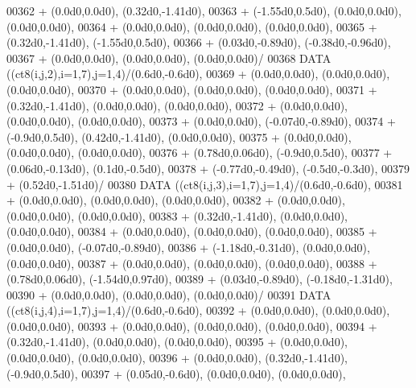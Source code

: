 \begin{DoxyCode}
00362      +                  (0.0d0,0.0d0), (0.32d0,-1.41d0),
00363      +                  (-1.55d0,0.5d0), (0.0d0,0.0d0), (0.0d0,0.0d0),
00364      +                  (0.0d0,0.0d0), (0.0d0,0.0d0), (0.0d0,0.0d0),
00365      +                  (0.32d0,-1.41d0), (-1.55d0,0.5d0),
00366      +                  (0.03d0,-0.89d0), (-0.38d0,-0.96d0),
00367      +                  (0.0d0,0.0d0), (0.0d0,0.0d0), (0.0d0,0.0d0)/
00368       \textcolor{keyword}{DATA}              ((ct8(i,j,2),i=1,7),j=1,4)/(0.6d0,-0.6d0),
00369      +                  (0.0d0,0.0d0), (0.0d0,0.0d0), (0.0d0,0.0d0),
00370      +                  (0.0d0,0.0d0), (0.0d0,0.0d0), (0.0d0,0.0d0),
00371      +                  (0.32d0,-1.41d0), (0.0d0,0.0d0), (0.0d0,0.0d0),
00372      +                  (0.0d0,0.0d0), (0.0d0,0.0d0), (0.0d0,0.0d0),
00373      +                  (0.0d0,0.0d0), (-0.07d0,-0.89d0),
00374      +                  (-0.9d0,0.5d0), (0.42d0,-1.41d0), (0.0d0,0.0d0),
00375      +                  (0.0d0,0.0d0), (0.0d0,0.0d0), (0.0d0,0.0d0),
00376      +                  (0.78d0,0.06d0), (-0.9d0,0.5d0),
00377      +                  (0.06d0,-0.13d0), (0.1d0,-0.5d0),
00378      +                  (-0.77d0,-0.49d0), (-0.5d0,-0.3d0),
00379      +                  (0.52d0,-1.51d0)/
00380       \textcolor{keyword}{DATA}              ((ct8(i,j,3),i=1,7),j=1,4)/(0.6d0,-0.6d0),
00381      +                  (0.0d0,0.0d0), (0.0d0,0.0d0), (0.0d0,0.0d0),
00382      +                  (0.0d0,0.0d0), (0.0d0,0.0d0), (0.0d0,0.0d0),
00383      +                  (0.32d0,-1.41d0), (0.0d0,0.0d0), (0.0d0,0.0d0),
00384      +                  (0.0d0,0.0d0), (0.0d0,0.0d0), (0.0d0,0.0d0),
00385      +                  (0.0d0,0.0d0), (-0.07d0,-0.89d0),
00386      +                  (-1.18d0,-0.31d0), (0.0d0,0.0d0), (0.0d0,0.0d0),
00387      +                  (0.0d0,0.0d0), (0.0d0,0.0d0), (0.0d0,0.0d0),
00388      +                  (0.78d0,0.06d0), (-1.54d0,0.97d0),
00389      +                  (0.03d0,-0.89d0), (-0.18d0,-1.31d0),
00390      +                  (0.0d0,0.0d0), (0.0d0,0.0d0), (0.0d0,0.0d0)/
00391       \textcolor{keyword}{DATA}              ((ct8(i,j,4),i=1,7),j=1,4)/(0.6d0,-0.6d0),
00392      +                  (0.0d0,0.0d0), (0.0d0,0.0d0), (0.0d0,0.0d0),
00393      +                  (0.0d0,0.0d0), (0.0d0,0.0d0), (0.0d0,0.0d0),
00394      +                  (0.32d0,-1.41d0), (0.0d0,0.0d0), (0.0d0,0.0d0),
00395      +                  (0.0d0,0.0d0), (0.0d0,0.0d0), (0.0d0,0.0d0),
00396      +                  (0.0d0,0.0d0), (0.32d0,-1.41d0), (-0.9d0,0.5d0),
00397      +                  (0.05d0,-0.6d0), (0.0d0,0.0d0), (0.0d0,0.0d0),

\end{DoxyCode}

